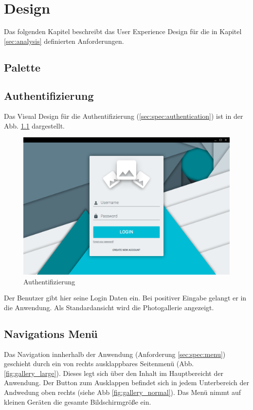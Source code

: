 \chapter{Design}

Das folgenden Kapitel beschreibt das User Experience Design für die in Kapitel \ref{sec:analysis} definierten Anforderungen.

\section{Palette}

\section{Authentifizierung}

Das Visual Design für die Authentifizierung (\ref{sec:spec:authentication}) ist in der Abb. \ref{fig:login_form} dargestellt.

\begin{figure}[htp]     %
\centering
\includegraphics[width=1.0\textwidth]{images/login_form} 
\caption{Authentifizierung}\label{fig:login_form}
\end{figure}

Der Benutzer gibt hier seine Login Daten ein. Bei positiver Eingabe gelangt er in die Anwendung. Als Standardansicht wird die Photogallerie angezeigt.

\section{Navigations Menü}

Das Navigation innherhalb der Anwendung (Anforderung \ref{sec:spec:menu}) geschieht durch ein von rechts ausklappbares Seitenmenü (Abb. \ref{fig:gallery_large}). Dieses legt sich über den Inhalt im Hauptbereicht der Anwendung. Der Button zum Ausklappen befindet sich in jedem Unterbereich der Andwedung oben rechts (siehe Abb \ref{fig:gallery_normal}). Das Menü nimmt auf kleinen Geräten die gesamte Bildschirmgröße ein.

